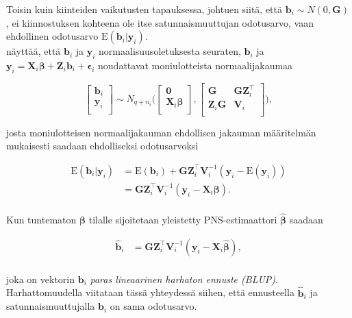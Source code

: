 \documentclass[finnish]{docopts}
\begin{document}
Toisin kuin kiinteiden vaikutusten tapauksessa, johtuen siitä, että $\bm{b}_i \sim N(0, \bm{G})$, ei kiinnostuksen kohteena ole itse satunnaismuuttujan odotusarvo, vaan ehdollinen odotusarvo $\text{E}(\bm{b}_i | \bm{y}_i)$. \\

\cite{nissinen09} näyttää, että $\bm{b}_i$ ja $\bm{y}_i$ normaalisuusoletuksesta seuraten, $\bm{b}_i$ ja $\bm{y}_i = \bm{X}_i \bm{\beta} + \bm{Z}_i \bm{b}_i + \bm{\epsilon}_i$ noudattavat moniulotteista normaalijakaumaa

$$
\begin{bmatrix}
\bm{b}_i \\
\bm{y}_i \\
\end{bmatrix}
\sim N_{q+n_i} \bigg(
\begin{bmatrix}
\bm{0} \\
\bm{X}_i \bm{\beta} \\
\end{bmatrix},
\begin{bmatrix}
\bm{G} & \bm{G} \bm{Z}_{i}^\top \\
\bm{Z}_i \bm{G} & \bm{V}_i \\
\end{bmatrix}
\bigg),
$$

josta moniulotteisen normaalijakauman ehdollisen jakauman määritelmän mukaisesti saadaan ehdolliseksi odotusarvoksi

$$
\begin{aligned}
\text{E}(\bm{b}_i | \bm{y}_i) &= \text{E}(\bm{b}_i) + \bm{G} \bm{Z}_{i}^\top \bm{V}_{i}^{-1}(\bm{y}_i - \text{E}(\bm{y}_i)) \\
&= \bm{G} \bm{Z}_{i}^\top \bm{V}_{i}^{-1}(\bm{y}_i - \bm{X}_i \bm{\beta}). \\
\end{aligned}
$$

Kun tuntematon $\bm{\beta}$ tilalle sijoitetaan yleistetty PNS-estimaattori $\hat{\bm{\beta}}$ saadaan

$$
\begin{aligned}
\hat{\bm{b}}_i &= \bm{G} \bm{Z}_{i}^\top \bm{V}_{i}^{-1}(\bm{y}_i - \bm{X}_i \hat{\bm{\beta}}), \\
\end{aligned}
$$

joka on vektorin $\bm{b}_i$ \textit{paras lineaarinen harhaton ennuste (BLUP)}.\\

Harhattomuudella viitataan tässä yhteydessä siihen, että ennusteella $\hat{\bm{b}}_i$ ja satunnaismuuttujalla $\bm{b}_i$ on sama odotusarvo. \\
\end{document}
